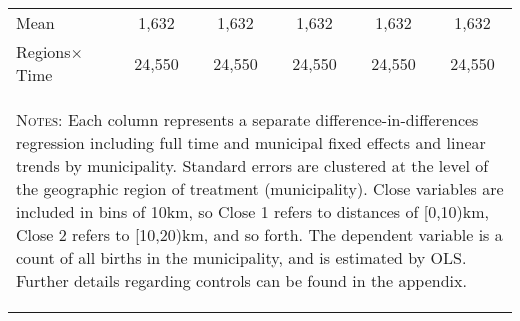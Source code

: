 \begin{table}[h!]
\begin{center}
{\begin{tabular}{lccccc}
Mean & 1,632 & 1,632 & 1,632 & 1,632 & 1,632 \\ 
Regions$\times$Time & 24,550 & 24,550 & 24,550 & 24,550 & 24,550  \\ \midrule
\multicolumn{6}{p{11.8cm}}{\begin{footnotesize}\textsc{Notes}: 
Each column represents a separate difference-in-differences regression including full time
and municipal fixed effects and linear trends by municipality. Standard errors are clustered at
the level of the geographic region of treatment (municipality). Close variables are included in
bins of 10km, so Close 1 refers to distances of [0,10)km, Close 2 refers to [10,20)km, and so
forth. The dependent variable is a count of all births in the municipality, and is estimated
by OLS.  Further details regarding controls can be found in the appendix.
\end{footnotesize}} \\ \bottomrule
\end{tabular}}
\end{center}
\end{table}
